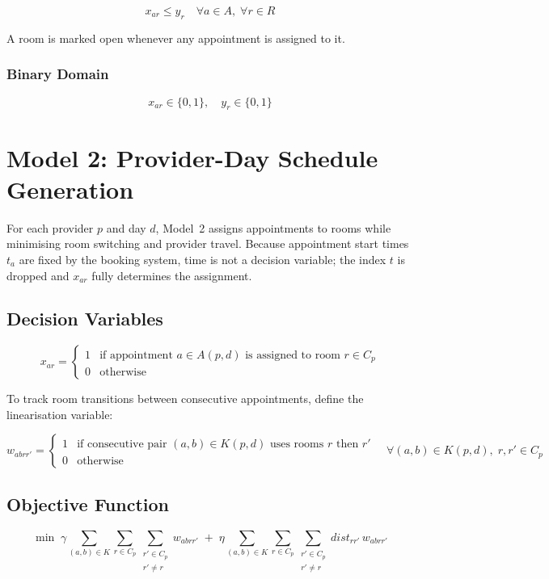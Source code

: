 \documentclass[12pt]{article}
\begin{document}
\[
x_{ar} \le y_r \quad \forall a \in A,\; \forall r \in R
\]

A room is marked open whenever any appointment is assigned to it.

\subsubsection*{Binary Domain}

\[
x_{ar} \in \{0,1\}, \quad y_r \in \{0,1\}
\]

\newpage

\section{Model 2: Provider-Day Schedule Generation}

For each provider $p$ and day $d$, Model~2 assigns appointments to rooms while minimising
room switching and provider travel. Because appointment start times $t_a$ are fixed by the
booking system, time is not a decision variable; the index $t$ is dropped and
$x_{ar}$ fully determines the assignment.

\subsection*{Decision Variables}

\[
x_{ar} =
\begin{cases}
1 & \text{if appointment } a \in A(p,d) \text{ is assigned to room } r \in C_p \\
0 & \text{otherwise}
\end{cases}
\]

To track room transitions between consecutive appointments, define the linearisation variable:

\[
w_{ab r r'} =
\begin{cases}
1 & \text{if consecutive pair } (a,b) \in K(p,d) \text{ uses rooms } r \text{ then } r' \\
0 & \text{otherwise}
\end{cases}
\quad \forall (a,b) \in K(p,d),\; r,r' \in C_p
\]

\subsection*{Objective Function}

\[
\min \;
\gamma \sum_{(a,b)\in K} \sum_{r \in C_p} \sum_{\substack{r' \in C_p \\ r' \neq r}} w_{ab r r'}
\;+\;
\eta \sum_{(a,b)\in K} \sum_{r \in C_p} \sum_{\substack{r' \in C_p \\ r' \neq r}} dist_{rr'}\, w_{ab r r'}
\]
\end{document}
